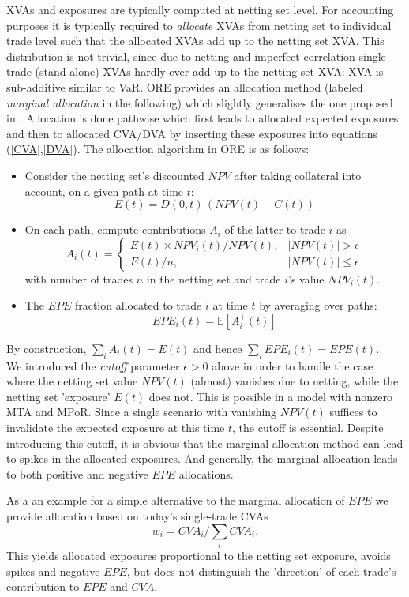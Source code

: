\documentclass[12pt, a4paper]{article}
\newcommand\E{\ensuremath{\mathbb{E}}}
\newcommand{\NPV}{\mathit{NPV}}
\newcommand{\CVA}{\mathit{CVA}}
\newcommand{\EPE}{\mathit{EPE}}
\begin{document}
{{\begin{appendix}
XVAs and exposures are typically computed at netting set level. For accounting purposes it is typically required to {\em
  allocate} XVAs from netting set to individual trade level such that the allocated XVAs add up to the netting set
XVA. This distribution is not trivial, since due to netting and imperfect correlation single trade (stand-alone) XVAs
hardly ever add up to the netting set XVA: XVA is sub-additive similar to VaR. ORE provides an allocation method
(labeled {\em marginal allocation } in the following) which slightly generalises the one proposed in
\cite{PykhtinRosen}. Allocation is done pathwise which first leads to allocated expected exposures and then to allocated
CVA/DVA by inserting these exposures into equations (\ref{CVA},\ref{DVA}). The allocation algorithm in ORE is as
follows:
\begin{itemize}
\item Consider the netting set's discounted $\NPV$ after taking collateral into account, on a given path at time $t$:
$$
E(t)=D(0,t)\,(\NPV(t)-C(t))
$$ 
\item On each path, compute contributions $A_i$ of the latter to trade $i$ as
$$
A_{i} (t) = \left\{ \begin{array}{ll} 
E(t) \times \NPV_{i}(t) / \NPV(t), & |\NPV(t)| > \epsilon \\
E(t) / n, & |\NPV(t)| \le \epsilon
\end{array}
\right. 
$$
with number of trades $n$ in the netting set and trade $i$'s value $\NPV_i(t)$.
\item The $\EPE$ fraction allocated to trade $i$ at time $t$ by averaging over paths:
$$
\EPE_i(t) = \E\left[ A_i^+(t) \right]
$$
\end{itemize}
By construction, $\sum_i A_i(t) = E(t)$ and hence $\sum_i \EPE_i(t) = \EPE(t)$.\\

We introduced the {\em cutoff } parameter $\epsilon>0$ above in order to handle the case where the netting set value
$\NPV(t)$ (almost) vanishes due to netting, while the netting set 'exposure' $E(t)$ does not. This is possible in a
model with nonzero MTA and MPoR. Since a single scenario with vanishing $\NPV(t)$ suffices to invalidate the expected
exposure at this time $t$, the cutoff is essential. Despite introducing this cutoff, it is obvious that the marginal
allocation method can lead to spikes in the allocated exposures. And generally, the marginal allocation leads to both
positive and negative $\EPE$ allocations.

\medskip As a an example for a simple alternative to the marginal allocation of $\EPE$ we provide allocation based on
today's single-trade CVAs
$$
w_i = \CVA_i / \sum_i \CVA_i.
$$
This yields allocated exposures proportional to the netting set exposure, avoids spikes and negative $\EPE$, but does
not distinguish the 'direction' of each trade's contribution to $\EPE$ and $\CVA$.


\end{appendix}}}
\end{document}
